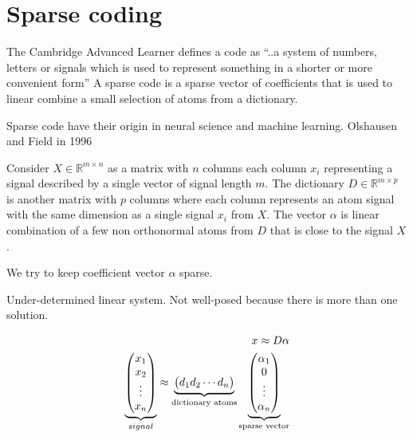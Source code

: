 \chapter{Sparse coding}
\thispagestyle{empty}

The Cambridge Advanced Learner defines a code as ``..a system of numbers, letters or signals which is used to represent something in a shorter or more convenient form''
A sparse code is a sparse vector of coefficients that is used to linear combine a small selection of atoms from a dictionary.

Sparse code have their origin in neural science and machine learning. Olshausen and Field in 1996 \cite{Olshausen1996}


Consider $X \in \mathbb{R}^{m\times n}$  as a matrix with $n$ columns each column $x_{i}$ representing a signal described by a single vector of signal length $m$.
The dictionary $D\in\mathbb{R}^{m \times p}$ is another matrix with $p$ columns where each column represents an atom signal with the same dimension as a single signal $x_{i}$ from $X$.
The vector $\alpha$ is linear combination of a few non orthonormal atoms from $D$ that is close to the signal $X$.

We try to keep coefficient vector $\alpha$ sparse. 

Under-determined linear system. Not well-posed because there is more than one solution. 

\begin{align}
x \approx D\alpha\notag\\
\underbrace{\begin{pmatrix} x_1 \\ x_2 \\ \vdots \\ x_n \end{pmatrix}}_{signal} \approx \underbrace{\begin{pmatrix} d_1  d_2 \cdots d_n \end{pmatrix}}_{\textrm{dictionary atoms}}
\underbrace{\begin{pmatrix} \alpha_1 \\ 0 \\ \vdots \\ \alpha_n \end{pmatrix}}_{\textrm{sparse vector}}
\end{align}

